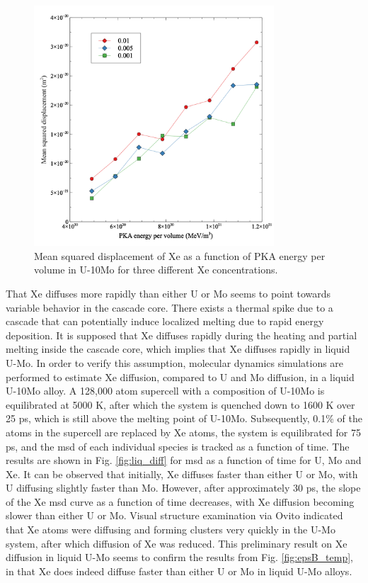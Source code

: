 \documentclass[review]{elsarticle}
\begin{document}
\begin{figure}[h]
 \centering
 \includegraphics[width=0.8\textwidth]{4_xefrac.png} 
 \caption{Mean squared displacement of Xe as a function of PKA energy per volume in U-10Mo for three different Xe concentrations.}
 \label{fig:xefrac}
\end{figure}

That Xe diffuses more rapidly than either U or Mo seems to point towards variable behavior in the cascade core. There exists a thermal spike due to a cascade that can potentially induce localized melting due to rapid energy deposition. It is supposed that Xe diffuses rapidly during the heating and partial melting inside the cascade core, which implies that Xe diffuses rapidly in liquid U-Mo. In order to verify this assumption, molecular dynamics simulations are performed to estimate Xe diffusion, compared to U and Mo diffusion, in a liquid U-10Mo alloy. A 128,000 atom supercell with a composition of U-10Mo is equilibrated at 5000 K, after which the system is quenched down to 1600 K over 25 ps, which is still above the melting point of U-10Mo. Subsequently, 0.1\% of the atoms in the supercell are replaced by Xe atoms, the system is equilibrated for 75 ps, and the msd of each individual species is tracked as a function of time. The results are shown in Fig. \ref{fig:liq_diff} for msd as a function of time for U, Mo and Xe. It can be observed that initially, Xe diffuses faster than either U or Mo, with U diffusing slightly faster than Mo. However, after approximately 30 ps, the slope of the Xe msd curve as a function of time decreases, with Xe diffusion becoming slower than either U or Mo. Visual structure examination via Ovito \cite{ovito} indicated that Xe atoms were diffusing and forming clusters very quickly in the U-Mo system, after which diffusion of Xe was reduced. This preliminary result on Xe diffusion in liquid U-Mo seems to confirm the results from Fig. \ref{fig:epsB_temp}, in that Xe does indeed diffuse faster than either U or Mo in liquid U-Mo alloys.
\end{document}
